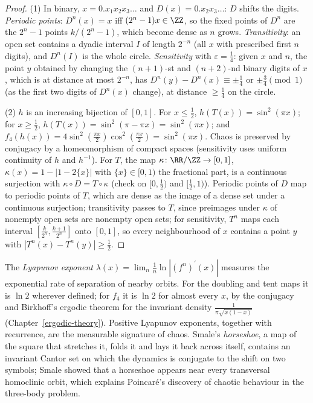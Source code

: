 \begin{proof}
(1) In binary, $x = 0.x_1x_2x_3\ldots$ and $D(x) = 0.x_2x_3\ldots$: $D$ shifts the digits. \emph{Periodic points}: $D^n(x) = x$ iff $(2^n - 1)x \in \ZZ$, so the fixed points of $D^n$ are the $2^n - 1$ points $k/(2^n - 1)$, which become dense as $n$
grows. \emph{Transitivity}: an open set contains a dyadic interval $I$ of length $2^{-n}$ (all $x$ with prescribed first $n$ digits), and $D^n(I)$ is the whole circle. \emph{Sensitivity} with $\varepsilon = \frac14$: given $x$ and $n$, the point $y$
obtained by changing the $(n + 1)$-st and $(n+2)$-nd binary digits of $x$, which is at distance at most $2^{-n}$, has $D^n(y) - D^n(x) \equiv \pm\frac14$ or $\pm\frac34 \pmod 1$ (as the first two digits of $D^n(x)$ change), at distance $\geq \frac14$ on the
circle.

(2) $h$ is an increasing bijection of $[0, 1]$. For $x \leq \frac12$, $h(T(x)) = \sin^2(\pi x)$; for $x \geq \frac12$, $h(T(x)) = \sin^2(\pi - \pi x) = \sin^2(\pi x)$; and $f_4(h(x)) = 4\sin^2(\frac{\pi x}{2})\cos^2(\frac{\pi x}{2}) = \sin^2(\pi x)$. Chaos is preserved by
conjugacy by a homeomorphism of compact spaces (sensitivity uses uniform continuity of $h$ and $h^{-1}$). For $T$, the map $\kappa \colon \RR/\ZZ \to [0, 1]$, $\kappa(x) = 1 - |1 - 2\{x\}|$ with $\{x\} \in [0, 1)$ the fractional part, is a continuous
surjection with $\kappa \circ D = T \circ \kappa$ (check on $[0, \frac12)$ and $[\frac12, 1)$). Periodic points of $D$ map to periodic points of $T$, which are dense as the image of a dense set under a continuous surjection; transitivity passes to $T$, since
preimages under $\kappa$ of nonempty open sets are nonempty open sets; for sensitivity,
$T^n$ maps each interval $[\frac{k}{2^n}, \frac{k + 1}{2^n}]$ onto $[0, 1]$, so every neighbourhood of $x$ contains a point $y$ with $|T^n(x) - T^n(y)| \geq \frac12$.
\end{proof}

\begin{remark}\label{ordinary-differential-equations:remark-lyapunov-exponents}
The \emph{Lyapunov exponent} $\lambda(x) = \lim_n\frac1n\ln|(f^n)^{\prime}(x)|$ measures the exponential rate of separation of nearby orbits. For the doubling and tent maps it is $\ln 2$ wherever defined; for $f_4$ it is $\ln 2$ for almost every
$x$, by the conjugacy and Birkhoff's ergodic theorem for the invariant density $\frac{1}{\pi\sqrt{x(1 - x)}}$ (Chapter~\ref{ergodic-theory}). Positive Lyapunov exponents, together with recurrence, are the measurable signature of chaos.
Smale's \emph{horseshoe}, a map of the square that stretches it, folds it and lays it back across itself, contains an invariant Cantor set on which the dynamics is conjugate to the shift on two symbols; Smale showed that a horseshoe
appears near every transversal homoclinic orbit, which explains Poincar\'e's discovery of chaotic behaviour in the three-body problem.
\end{remark}


